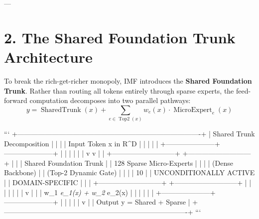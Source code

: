 \documentclass[11pt,twoside,openright]{amsbook}
\begin{document}
{{{{{{{{---

\section{2. The Shared Foundation Trunk Architecture}

To break the rich-get-richer monopoly, IMF introduces the \textbf{Shared Foundation Trunk}. Rather than routing all tokens entirely through sparse experts, the feed-forward computation decomposes into two parallel pathways:
$$y = \operatorname{SharedTrunk}(x) + \sum_{e \in \operatorname{Top2}(x)} w_e(x) \cdot \operatorname{MicroExpert}_e(x)$$

```
+-------------------------------------------------------------------------------+
|                            Shared Trunk Decomposition                         |
|                                                                               |
|                               Input Token x in R^D                            |
|                                        |                                      |
|                  +---------------------+---------------------+                |
|                  |                                           |                |
|                  v                                           v                |
|    +---------------------------+               +---------------------------+  |
|    |   Shared Foundation Trunk |               |  128 Sparse Micro-Experts |  |
|    |      (Dense Backbone)     |               |    (Top-2 Dynamic Gate)   |  |
|    |    10%
|    |   UNCONDITIONALLY ACTIVE  |               |      DOMAIN-SPECIFIC      |  |
|    +---------------------------+               +---------------------------+  |
|                  |                                           |                |
|                  |                                           v                |
|                  |                             w_1 \textit{ e_1(x) + w_2 } e_2(x)    |
|                  |                                           |                |
|                  +---------------------+---------------------+                |
|                                        |                                      |
|                                        v                                      |
|                        Output y = Shared + Sparse                             |
+-------------------------------------------------------------------------------+
```

}}}}}}}}
\end{document}
